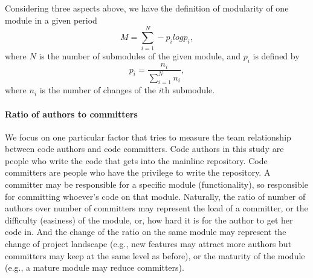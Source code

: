 \documentclass{sig-alternate-05-2015}
\begin{document}
Considering three aspects above, we have the definition of modularity of one module in a given period
\begin{equation}
\label{def_modularity}
M = \sum\limits_{i=1}^{N} - p_{i} log p_{i}, 
\end{equation}
where $N$ is the number of submodules of the given module, and $p_{i}$ is defined by
\begin{equation}
\label{def_pi}
p_{i} = \frac{n_{i}}{\sum\limits_{i=1}^{N} n_{i}}, 
\end{equation}
where $n_{i}$ is the number of changes of the $i$th submodule.


\paragraph{Ratio of authors to committers}
We focus on one particular factor that tries to measure the team relationship between
code authors and code committers. Code authors in this study are people who
write the code that gets into the mainline repository. Code committers are
people who have the privilege to write the repository. A committer may be
responsible for a specific module (functionality), so responsible for committing
whoever's code on that module. 
Naturally, the ratio of number of authors over number of committers may represent the load of a committer, or the difficulty (easiness) of the module, or, how hard it is for the author to 
get her code in. And the change of the ratio on the same module may represent
the change of project landscape (e.g., new features may attract more authors but
committers may keep at the same level as before), or the maturity of the module (e.g.,
a mature module may reduce committers). 
\end{document}
